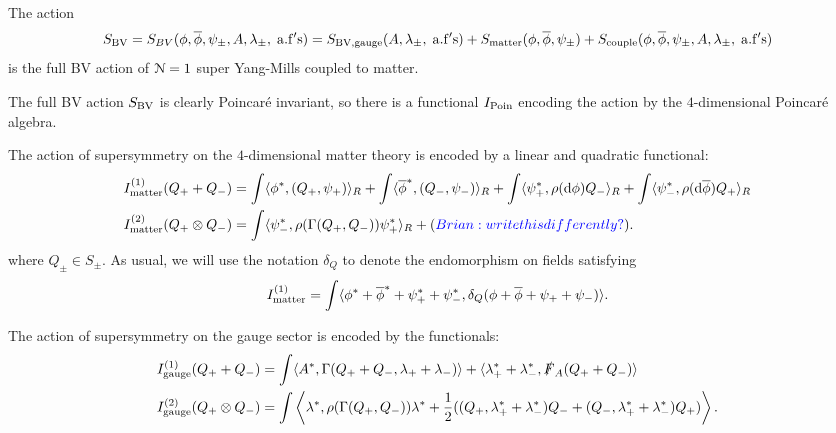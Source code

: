 \documentclass[10pt, oneside]{article}
\begin{document}
The action
\[
S_{\rm BV} = S_{BV}(\phi, \Bar{\phi}, \psi_\pm , A, \lambda_\pm, \; {\rm a.f's}) = S_{\rm BV, gauge}(A, \lambda_\pm, \; {\rm a.f's}) + S_{\rm matter}(\phi, \Bar{\phi}, \psi_\pm) + S_{\rm couple} (\phi, \Bar{\phi}, \psi_\pm , A, \lambda_\pm, \; {\rm a.f's}) 
\]
is the full BV action of $\mc N = 1$ super Yang-Mills coupled to matter.

The full BV action $S_{\rm BV}$ is clearly Poincar\'{e} invariant, so there is a functional $I_{\rm Poin}$ encoding the action by the $4$-dimensional Poincar\'{e} algebra.

The action of supersymmetry on the $4$-dimensional matter theory is encoded by a linear and quadratic functional:
\begin{align*}
I^{(1)}_{\rm matter} (Q_+ + Q_-) & = \int \<\phi^*, (Q_+, \psi_+)\>_R + \int \<\Bar{\phi}^*, (Q_-, \psi_-)\>_R + \int \<\psi^*_+, \rho(\d \phi) Q_- \>_R + \int \<\psi_-^*, \rho(\d \Bar{\phi}) Q_+\>_R \\
I^{(2)}_{\rm matter} (Q_+ \otimes Q_-) & = \int \<\psi^*_- , \rho(\Gamma(Q_+, Q_-)) \psi_+^*\>_R + \brian{write this differently?}.
\end{align*}
where $Q_\pm \in S_{\pm}$. 
As usual, we will use the notation $\delta_Q$ to denote the endomorphism on fields satisfying
\[
I^{(1)}_{\rm matter} = \int \<\phi^* + \Bar{\phi}^* + \psi^*_+ + \psi_-^*, \delta_Q(\phi + \Bar{\phi} + \psi_+ + \psi_-) \> .
\]

The action of supersymmetry on the gauge sector is encoded by the functionals:
\begin{align*}
I^{(1)}_{\rm gauge} (Q_+ + Q_-) & = \int \<A^* , \Gamma(Q_+ + Q_-, \lambda_+ + \lambda_-)\> + \<\lambda_+^*+\lambda_-^*, \sd F_A (Q_+ + Q_-)\> \\
I^{(2)}_{\rm gauge} (Q_+ \otimes Q_-) & = \int \left\<\lambda^*, \rho(\Gamma(Q_+, Q_-)) \lambda^* + \frac{1}{2} ((Q_+, \lambda_+^*+\lambda_-^*) Q_- + (Q_-, \lambda^*_+ + \lambda_-^*)Q_+)\right\> .
\end{align*}
\end{document}
